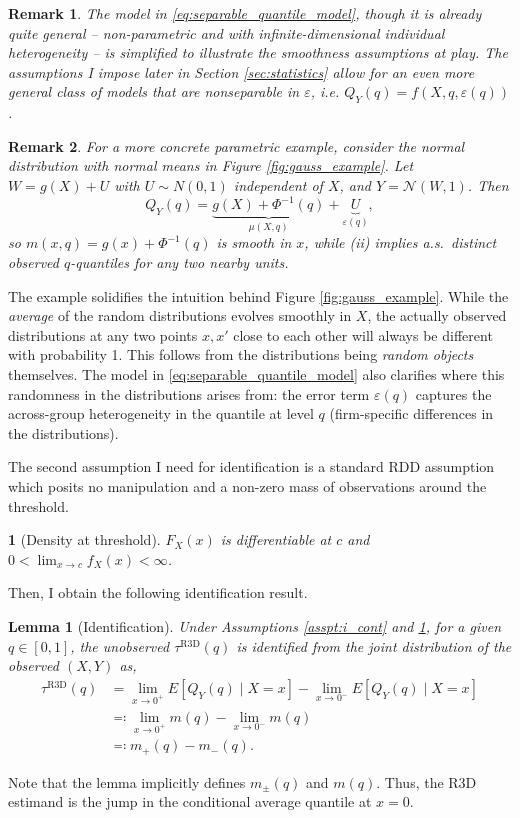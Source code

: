 \documentclass[12pt]{article}
\newtheorem{lemma}{Lemma}
\newtheorem{remark}{Remark}
\newtheorem{assumpI}{}
\begin{document}
\begin{remark}
The model in \eqref{eq:separable_quantile_model}, though it is already quite general -- non-parametric and with infinite-dimensional individual heterogeneity -- is simplified to illustrate the smoothness assumptions at play. The assumptions I impose later in Section \ref{sec:statistics} allow for an even more general class of models that are nonseparable in $\varepsilon$, i.e. $Q_Y(q) = f(X, q, \varepsilon(q))$. 
\end{remark}
\begin{remark}
For a more concrete parametric example, consider the normal distribution with normal means in Figure \ref{fig:gauss_example}. Let $W=g(X)+U$ with $U\sim N(0,1)$ independent of $X$, and $Y=\mathcal{N}(W,1)$. Then
\[
Q_Y(q)=\underbrace{g(X)+\Phi^{-1}(q)}_{\mu(X,q)}+\underbrace{U}_{\varepsilon(q)},
\]
so $m(x,q)=g(x)+\Phi^{-1}(q)$ is smooth in $x$, while (ii) implies a.s.\ distinct observed $q$-quantiles for any two nearby units.
\end{remark}


The example solidifies the intuition behind Figure \ref{fig:gauss_example}. While the \textit{average} of the random distributions evolves smoothly in $X$, the actually observed distributions at any two points $x, x'$ close to each other will always be different with probability 1. This follows from the distributions being \textit{random objects} themselves. The model in \eqref{eq:separable_quantile_model} also clarifies where this randomness in the distributions arises from: the error term $\varepsilon(q)$ captures the across-group heterogeneity in the quantile at level $q$ (firm-specific differences in the distributions). 

The second assumption I need for identification is a standard RDD assumption which posits no manipulation and a non-zero mass of observations around the threshold.


\begin{assumpI}[Density at threshold] \label{asspt:i_dens}
$F_X(x)$ is differentiable at $c$ and $0 < \lim_{x\to c} f_X(x) < \infty$. 
\end{assumpI}

Then, I obtain the following identification result. 

\begin{lemma}[Identification] \label{lemma:ident}
Under Assumptions \ref{asspt:i_cont} and \ref{asspt:i_dens}, for a given $q \in [0,1]$, the unobserved $\tau^{\mathrm{R3D}}(q)$ is identified from the joint distribution of the observed $(X,Y)$ as,
\begin{align}
\tau^{\mathrm{R3D}}(q) & = \lim_{x \to 0^+} E[Q_Y(q) \mid X=x] -  \lim_{x \to 0^-} E[Q_Y(q) \mid X=x] \\
& \eqqcolon \lim_{x \to 0^+} m(q) -  \lim_{x \to 0^-} m(q) \nonumber \\
& \eqqcolon m_{+}(q) - m_{-}(q). \nonumber
\end{align}
\end{lemma}
Note that the lemma implicitly defines $m_{\pm}(q)$ and $m(q)$. Thus, the R3D estimand is the jump in the conditional average quantile at $x=0$.
\end{document}
